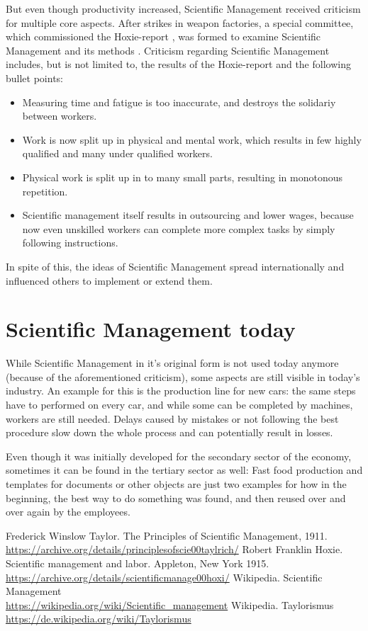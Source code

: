 \documentclass[a4paper,11pt]{article}
\begin{document}
But even though productivity increased, Scientific Management received
criticism for multiple core aspects. After strikes in weapon factories, a
special committee, which commissioned the Hoxie-report \cite{hoxie}, was
formed to examine Scientific Management and its methods \cite{wikipediade}.
Criticism regarding Scientific Management includes, but is not limited to, the
results of the Hoxie-report and the following bullet points:
\begin{itemize}
\item Measuring time and fatigue is too inaccurate, and destroys the solidariy
  between workers.
\item Work is now split up in physical and mental work, which results in few
  highly qualified and many under qualified workers.
\item Physical work is split up in to many small parts, resulting in
  monotonous repetition.
\item Scientific management itself results in outsourcing and lower wages,
  because now even unskilled workers can complete more complex tasks by simply
  following instructions.
\end{itemize}
In spite of this, the ideas of Scientific Management spread internationally
and influenced others to implement or extend them.

\section{Scientific Management today}
While Scientific Management in it's original form is not used today anymore
(because of the aforementioned criticism), some aspects are still visible in
today's industry. An example for this is the production line for new cars: the
same steps have to performed on every car, and while some can be completed by
machines, workers are still needed. Delays caused by mistakes or not following
the best procedure slow down the whole process and can potentially result in
losses.

Even though it was initially developed for the secondary sector of the
economy, sometimes it can be found in the tertiary sector as well: Fast food
production and templates for documents or other objects are just two examples
for how in the beginning, the best way to do something was found, and then
reused over and over again by the employees.

\raggedright
\begin{thebibliography}{xxx}
 Frederick Winslow Taylor. The Principles of Scientific
  Management, 1911.\\
  \url{https://archive.org/details/principlesofscie00taylrich/}
 Robert Franklin Hoxie. Scientific management and
  labor. Appleton, New York 1915.\\
  \url{https://archive.org/details/scientificmanage00hoxi/}
 Wikipedia. Scientific Management\\
  \url{https://wikipedia.org/wiki/Scientific_management}
 Wikipedia. Taylorismus\\
  \url{https://de.wikipedia.org/wiki/Taylorismus}
\end{thebibliography}
%
\end{document}
